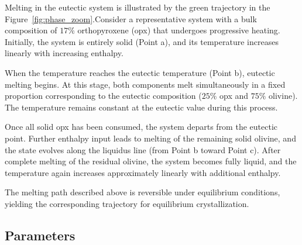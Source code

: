 Melting in the eutectic system is illustrated by the green trajectory in the Figure~\ref{fig:phase_zoom}.Consider a representative system with a bulk composition of $17\%$ orthopyroxene (opx) that undergoes progressive 
heating. Initially, the system is entirely solid (Point a), and its temperature increases 
linearly with increasing enthalpy. 

When the temperature reaches the eutectic temperature (Point b), eutectic melting begins. At this stage, 
both components melt simultaneously in a fixed proportion corresponding to the eutectic composition 
($25\%$ opx and $75\%$ olivine). The temperature remains constant at the eutectic value during this process.

Once all solid opx has been consumed, the system departs from the eutectic point. Further enthalpy input leads
to melting of the remaining solid olivine, and the state evolves along the liquidus line (from Point b toward 
Point c). After complete melting of the residual olivine, the system becomes fully liquid, and the temperature
again increases approximately linearly with additional enthalpy.

The melting path described above is reversible under equilibrium conditions, yielding the corresponding 
trajectory for equilibrium crystallization.

\newpage
\subsection{Parameters}

